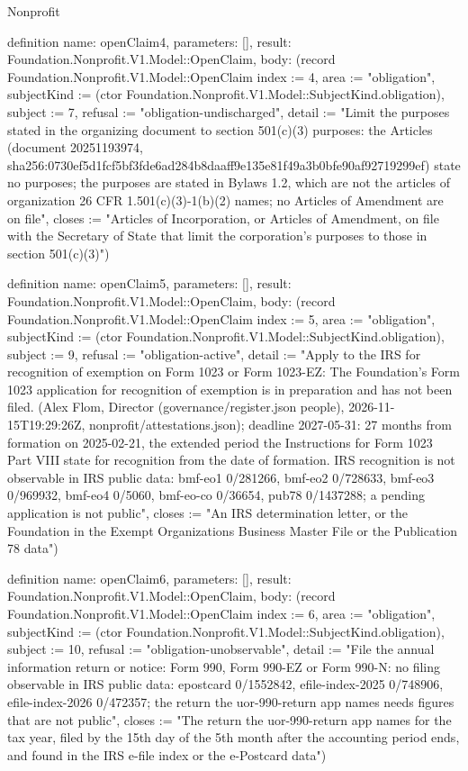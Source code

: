 \begin{lexlean}{Nonprofit}
\begin{semanticmodule}
definition{
  name: openClaim4,
  parameters: [],
  result: Foundation.Nonprofit.V1.Model::OpenClaim,
  body: (record Foundation.Nonprofit.V1.Model::OpenClaim {index := 4, area := "obligation", subjectKind := (ctor Foundation.Nonprofit.V1.Model::SubjectKind.obligation), subject := 7, refusal := "obligation-undischarged", detail := "Limit the purposes stated in the organizing document to section 501(c)(3) purposes: the Articles (document 20251193974, sha256:0730ef5d1fcf5bf3fde6ad284b8daaff9e135e81f49a3b0bfe90af92719299ef) state no purposes; the purposes are stated in Bylaws 1.2, which are not the articles of organization 26 CFR 1.501(c)(3)-1(b)(2) names; no Articles of Amendment are on file", closes := "Articles of Incorporation, or Articles of Amendment, on file with the Secretary of State that limit the corporation's purposes to those in section 501(c)(3)"})
}

definition{
  name: openClaim5,
  parameters: [],
  result: Foundation.Nonprofit.V1.Model::OpenClaim,
  body: (record Foundation.Nonprofit.V1.Model::OpenClaim {index := 5, area := "obligation", subjectKind := (ctor Foundation.Nonprofit.V1.Model::SubjectKind.obligation), subject := 9, refusal := "obligation-active", detail := "Apply to the IRS for recognition of exemption on Form 1023 or Form 1023-EZ: The Foundation's Form 1023 application for recognition of exemption is in preparation and has not been filed. (Alex Flom, Director (governance/register.json people), 2026-11-15T19:29:26Z, nonprofit/attestations.json); deadline 2027-05-31: 27 months from formation on 2025-02-21, the extended period the Instructions for Form 1023 Part VIII state for recognition from the date of formation. IRS recognition is not observable in IRS public data: bmf-eo1 0/281266, bmf-eo2 0/728633, bmf-eo3 0/969932, bmf-eo4 0/5060, bmf-eo-co 0/36654, pub78 0/1437288; a pending application is not public", closes := "An IRS determination letter, or the Foundation in the Exempt Organizations Business Master File or the Publication 78 data"})
}

definition{
  name: openClaim6,
  parameters: [],
  result: Foundation.Nonprofit.V1.Model::OpenClaim,
  body: (record Foundation.Nonprofit.V1.Model::OpenClaim {index := 6, area := "obligation", subjectKind := (ctor Foundation.Nonprofit.V1.Model::SubjectKind.obligation), subject := 10, refusal := "obligation-unobservable", detail := "File the annual information return or notice: Form 990, Form 990-EZ or Form 990-N: no filing observable in IRS public data: epostcard 0/1552842, efile-index-2025 0/748906, efile-index-2026 0/472357; the return the uor-990-return app names needs figures that are not public", closes := "The return the uor-990-return app names for the tax year, filed by the 15th day of the 5th month after the accounting period ends, and found in the IRS e-file index or the e-Postcard data"})
}


\end{semanticmodule}
\end{lexlean}
